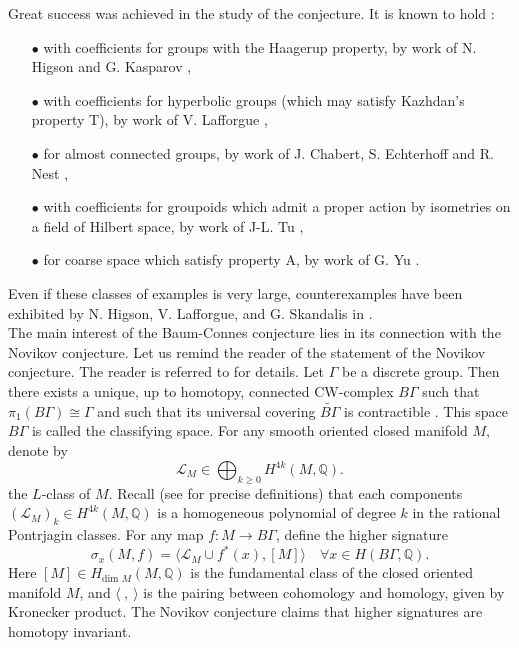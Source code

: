 Great success was achieved in the study of the conjecture. It is known to hold :\\
\begin{itemize}
\item[$\bullet$] with coefficients for groups with the Haagerup property, by work of N. Higson and G. Kasparov \cite{higsonkasparov},
\item[$\bullet$] with coefficients for hyperbolic groups (which may satisfy Kazhdan's property T), by work of V. Lafforgue \cite{Lafforgue}, 
\item[$\bullet$] for almost connected groups, by work of J. Chabert, S. Echterhoff and R. Nest \cite{chabertEN},
\item[$\bullet$] with coefficients for groupoids which admit a proper action by isometries on a field of Hilbert space, by work of J-L. Tu \cite{TuThese},
\item[$\bullet$] for coarse space which satisfy property A, by work of G. Yu \cite{Yu2}.\\
\end{itemize}  
Even if these classes of examples is very large, counterexamples have been exhibited by N. Higson, V. Lafforgue, and G. Skandalis in \cite{HigsonLaffSk}.\\

The main interest of the Baum-Connes conjecture lies in its connection with the Novikov conjecture. Let us remind the reader of the statement of the Novikov conjecture. The reader is referred to \cite{kreckluck} for details. Let $\Gamma$ be a discrete group. Then there exists a unique, up to homotopy, connected CW-complex $B\Gamma$ such that $\pi_1(B \Gamma) \cong \Gamma$ and such that its universal covering $\tilde{B\Gamma}$ is contractible \cite{May}. This space $B\Gamma$ is called the classifying space. For any smooth oriented closed manifold $M$, denote by \[\mathcal L_M \in \bigoplus_{k\geq 0} H^{4k}(M,\mathbb Q).\] the $L$-class of $M$. Recall (see \cite{kreckluck} for precise definitions) that each components $(\mathcal L_M)_k\in H^{4k}(M,\mathbb Q) $ is a homogeneous polynomial of degree $k$ in the rational Pontrjagin classes. For any map $f: M\rightarrow B\Gamma$, define the higher signature 
\[\sigma_x(M,f) = \langle \mathcal L_M \cup f^*(x),[M] \rangle \quad \forall x\in H(B\Gamma,\mathbb Q).\]
Here $[M]\in H_{\text{dim }M}(M,\mathbb Q)$ is the fundamental class of the closed oriented manifold $M$, and $\langle \ , \ \rangle $ is the pairing between cohomology and homology, given by Kronecker product. The Novikov conjecture claims that higher signatures are homotopy invariant.

